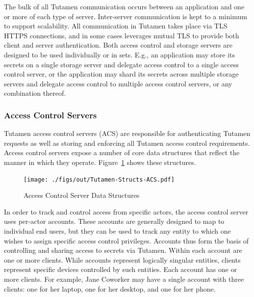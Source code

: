 The bulk of all Tutamen communication occurs between an application
and one or more of each type of server. Inter-server communication is
kept to a minimum to support scalability. All communication in Tutamen
takes place via TLS~\cite{dierks2008} HTTPS connections, and in some
cases leverages mutual TLS to provide both client and server
authentication. Both access control and storage servers are designed
to be used individually or in sets. E.g., an application may store its
secrets on a single storage server and delegate access control to a
single access control server, or the application may shard its secrets
across multiple storage servers and delegate access control to
multiple access control servers, or any combination thereof.

\subsubsection{Access Control Servers}
\label{chap:tutamen:platform:arch:acs}

Tutamen access control servers (ACS) are responsible for
authenticating Tutamen requests as well as storing and enforcing all
Tutamen access control requirements. Access control servers expose a
number of core data structures that reflect the manner in which they
operate. Figure~\ref{fig:tutamen:acstructs} shows these structures.

\begin{figure}[t]
  \centering
  \texttt{[image: ./figs/out/Tutamen-Structs-ACS.pdf]}
  \caption{Access Control Server Data Structures}
  \label{fig:tutamen:acstructs}
\end{figure}

In order to track and control access from specific actors, the access
control server uses per-actor accounts. These accounts are generally
designed to map to individual end users, but they can be used to track
any entity to which one wishes to assign specific access control
privileges. Accounts thus form the basis of controlling and sharing
access to secrets via Tutamen. Within each account are one or more
clients. While accounts represent logically singular entities, clients
represent specific devices controlled by such entities. Each account
has one or more clients. For example, Jane Coworker may have a single
account with three clients: one for her laptop, one for her desktop,
and one for her phone.

